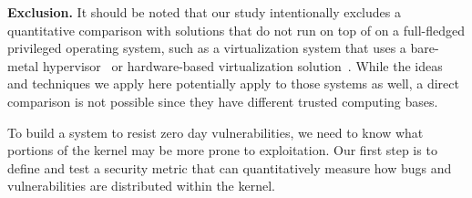 \noindent
\textbf{Exclusion.}
It should be noted that our study intentionally excludes %
a quantitative comparison with solutions that do not run on top of on a 
full-fledged privileged operating system, such as a virtualization system that 
uses a bare-metal hypervisor~\cite{Xen-03} or 
hardware-based virtualization solution~\cite{IntelVT}. 
While the ideas and techniques we apply here potentially apply to those 
systems as well, a direct comparison is not possible since they have different
trusted computing bases.

To build a system to resist zero day vulnerabilities, we need to know what
portions of the kernel may be more prone to exploitation. Our first step is to
define and test a security metric that can quantitatively measure how bugs and
vulnerabilities are distributed within the kernel.
